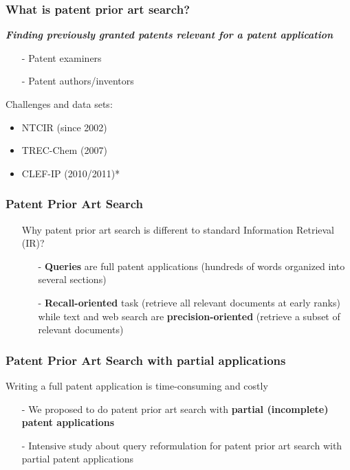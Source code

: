 \documentclass[xcolor=x11names,compress]{beamer}
\renewcommand{\(}{\begin{columns}}
\renewcommand{\)}{\end{columns}}
\newcommand{\<}[1]{\begin{column}{#1}}
\renewcommand{\>}{\end{column}}
\begin{document}
\begin{frame}
\frametitle{What is patent prior art search?}
{\color{DeepSkyBlue4}\textit{\textbf{Finding previously granted patents relevant for a patent application}}}

\begin{itemize}
\item[-] Patent examiners
\item[-] Patent authors/inventors
\end{itemize}


Challenges and data sets:
\begin{itemize}
\item NTCIR (since 2002)
\item TREC-Chem (2007)
\item CLEF-IP (2010/2011)*
\end{itemize}
\end{frame}



\begin{frame}
\frametitle{Patent Prior Art Search}
\begin{itemize}
\item[] Why patent prior art search is different to standard Information Retrieval (IR)?
  \begin{itemize}
  \item[]
  \item[-] \textbf{Queries} are full patent applications (hundreds of words organized into several sections)  	
   \item[]
  \item[-] \textbf{Recall-oriented} task (retrieve all relevant documents at early ranks)
  	while text and web search are \textbf{precision-oriented} (retrieve a subset of relevant documents)
  \end{itemize}
\end{itemize}
\end{frame}



\begin{frame}
\frametitle{Patent Prior Art Search with partial applications}
Writing a full patent application is time-consuming and costly

\begin{itemize}
\item[-] We proposed to do patent prior art search with \textbf{partial (incomplete) patent applications}
\item[-] Intensive study about query reformulation for patent prior art search with partial patent applications
\end{itemize}
\end{frame}
\end{document}
